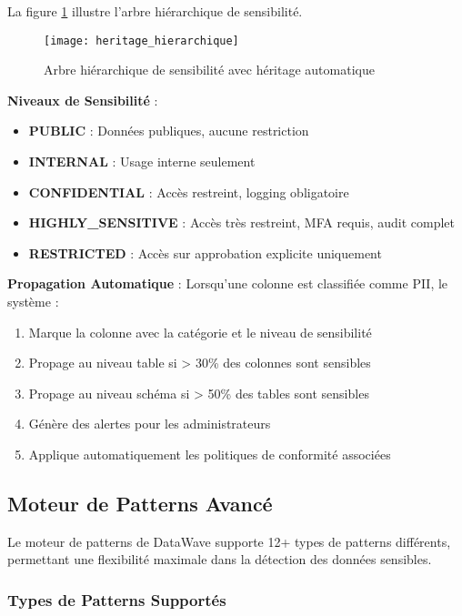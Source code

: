 La figure \ref{fig:heritage_hierarchique} illustre l'arbre hiérarchique de sensibilité.

\begin{figure}[htpb]
\centering
\texttt{[image: heritage\_hierarchique]}
\caption{Arbre hiérarchique de sensibilité avec héritage automatique}
\label{fig:heritage_hierarchique}
\end{figure}

\textbf{Niveaux de Sensibilité} :
\begin{itemize}
    \item \textbf{PUBLIC} : Données publiques, aucune restriction
    \item \textbf{INTERNAL} : Usage interne seulement
    \item \textbf{CONFIDENTIAL} : Accès restreint, logging obligatoire
    \item \textbf{HIGHLY\_SENSITIVE} : Accès très restreint, MFA requis, audit complet
    \item \textbf{RESTRICTED} : Accès sur approbation explicite uniquement
\end{itemize}

\textbf{Propagation Automatique} : Lorsqu'une colonne est classifiée comme PII, le système :
\begin{enumerate}
    \item Marque la colonne avec la catégorie et le niveau de sensibilité
    \item Propage au niveau table si > 30\% des colonnes sont sensibles
    \item Propage au niveau schéma si > 50\% des tables sont sensibles
    \item Génère des alertes pour les administrateurs
    \item Applique automatiquement les politiques de conformité associées
\end{enumerate}

\subsection{Moteur de Patterns Avancé}

Le moteur de patterns de DataWave supporte 12+ types de patterns différents, permettant une flexibilité maximale dans la détection des données sensibles.

\subsubsection{Types de Patterns Supportés}


